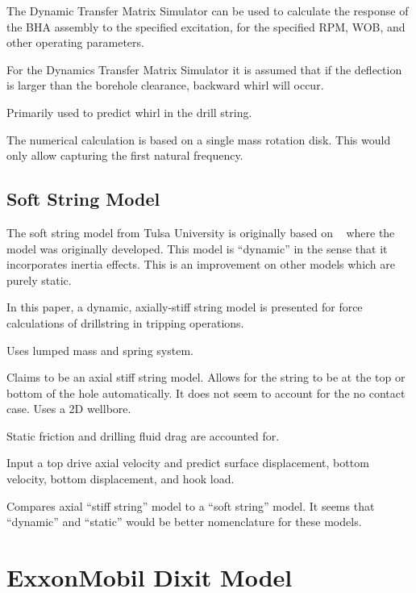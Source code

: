 The Dynamic Transfer Matrix Simulator can be used to calculate the response of the BHA assembly to the specified excitation, for the specified RPM, WOB, and other operating parameters.

For the Dynamics Transfer Matrix Simulator it is assumed that if the deflection is larger than the borehole clearance, backward whirl will occur.

Primarily used to predict whirl in the drill string.

The numerical calculation is based on a single mass rotation disk.  This would only allow capturing the first natural frequency.

\notfinished{}


\subsection{Soft String Model}
The soft string model from Tulsa University is originally based on ~\cite{ref:miska2015a} where the model was originally developed.  This model is ``dynamic'' in the sense that it incorporates inertia effects.  This is an improvement on other models which are purely static.

\notfinished{}

\cite{ref:zamanipour2018a}

In this paper, a dynamic, axially-stiff string model is presented for force calculations of drillstring in tripping operations.

Uses lumped mass and spring system.

Claims to be an axial stiff string model.  Allows for the string to be at the top or bottom of the hole automatically.  It does not seem to account for the no contact case.
Uses a 2D wellbore.

Static friction and drilling fluid drag are accounted for.

Input a top drive axial velocity and predict surface displacement, bottom velocity, bottom displacement, and hook load.

Compares axial ``stiff string'' model to a ``soft string'' model.  It seems that ``dynamic'' and ``static'' would be better nomenclature for these models.

\section{ExxonMobil Dixit Model}

\notfinished{}








